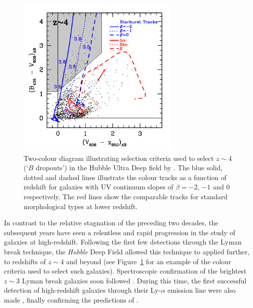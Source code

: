 \begin{figure}
\centering
	  \includegraphics[width=0.7\textwidth]{BouwensCuts.pdf}
	  \caption{Two-colour diagram illustrating selection criteria used to select $z\sim4$ (`$B$ dropouts') in the Hubble Ultra Deep field by \citet{Bouwens:2009ik}. The blue solid, dotted and dashed lines illustrate the colour tracks as a function of redshift for galaxies with UV continuum slopes of $\beta = -2$, $-1$ and 0 respectively. The red lines show the comparable tracks for standard morphological types at lower redshift.}
	  \label{fig:colourcuts}
\end{figure}

In contrast to the relative stagnation of the preceding two decades, the subsequent years have seen a relentless and rapid progression in the study of galaxies at high-redshift. Following the first few detections through the Lyman break technique, the \emph{Hubble} Deep Field allowed this technique to applied further, to redshifts of $z\sim4$ and beyond \citep{Steidel:1995kx,1996MNRAS.283.1388M} (see Figure~\ref{fig:colourcuts} for an example of the colour criteria used to select such galaxies). Spectroscopic confirmation of the brightest $z\sim3$ Lyman break galaxies soon followed \citep{Steidel:1996jd}. During this time, the first successful detection of high-redshift galaxies through their Ly-$\alpha$ emission line were also made \citep{Hu:1996eq, Hu:1998uh, Cowie:1998dt}, finally confirming the predictions of \citeauthor{Partridge:1967iw}. 


